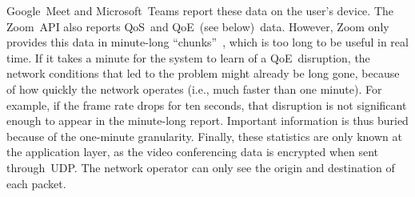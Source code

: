         Google~Meet and Microsoft~Teams report these data on the user's device. The Zoom~API also reports QoS~and QoE~(see below)~data. However, Zoom only provides this data in minute-long \enquote{chunks}~\autocite{walia2019}, which is too long to be useful in real time. If it takes a minute for the system to learn of a QoE~disruption, the network conditions that led to the problem might already be long gone, because of how quickly the network operates (i.e., much faster than one minute). For example, if the frame rate drops for ten seconds, that disruption is not significant enough to appear in the minute-long report. Important information is thus buried because of the one-minute granularity. Finally, these statistics are only known at the application layer, as the video conferencing data is encrypted when sent through~UDP. The network operator can only see the origin and destination of each packet.



